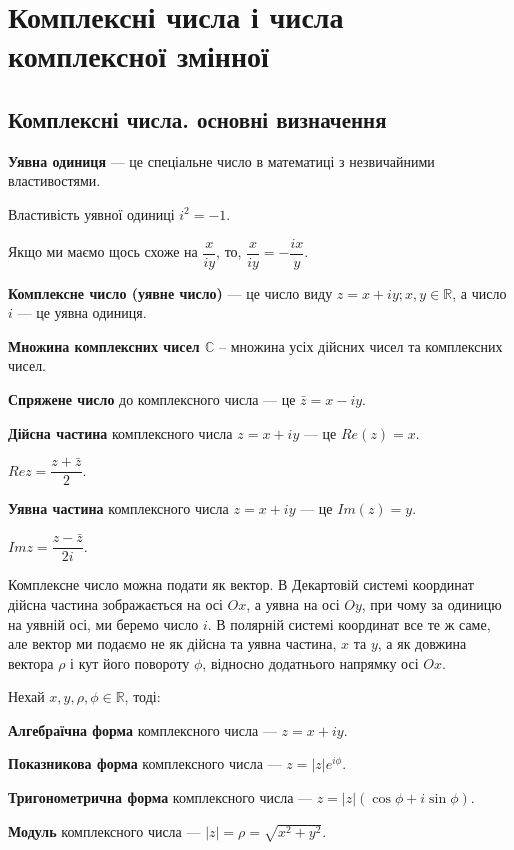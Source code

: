 \chapter{Комплексні числа і числа комплексної змінної}

\section{Комплексні числа. основні визначення}

\textbf{Уявна одиниця} --- це спеціальне число в математиці з незвичайними властивостями.

Властивість уявної одиниці $i^2 = -1$.

Якщо ми маємо щось схоже на $\dfrac{x}{iy}$, то, $\dfrac{x}{iy} = - \dfrac{ix}{y}$.

\textbf{Комплексне число (уявне число)} --- це число виду $z = x + iy; x, y \in \mathbb{R}$,
а число $i$ --- це уявна одиниця.

\textbf{Множина комплексних чисел $\mathbb{C}$} -- множина усіх дійсних чисел та комплексних чисел.

\textbf{Спряжене число} до комплексного числа --- це $\bar z = x - iy$.

\textbf{Дійсна частина} комплексного числа $z = x + iy$ --- це $Re(z) = x$.

$Re z = \dfrac{z + \bar{z}}{2}$.

\textbf{Уявна частина} комплексного числа $z = x + iy$ --- це $Im(z) = y$.

$Im z = \dfrac{z - \bar{z}}{2i}$.

Комплексне число можна подати як вектор.
В Декартовій системі координат дійсна частина зображається на осі $Ox$, а уявна на осі $Oy$, при чому за одиницю на уявній осі, ми беремо число $i$.
В полярній системі координат все те ж саме, але вектор ми подаємо не як дійсна  та уявна частина, $x$ та $y$, а як довжина вектора $\rho$ і кут його повороту $\phi$, відносно додатнього напрямку осі $Ox$.

Нехай $x, y, \rho, \phi \in \mathbb{R}$, тоді:

\textbf{Алгебраїчна форма} комплексного числа --- $z = x + iy$.

\textbf{Показникова форма} комплексного числа --- $z = |z|e^{i \phi}$.

\textbf{Тригонометрична форма} комплексного числа --- $z = |z| (\cos \phi + i \sin \phi)$.

\textbf{Модуль} комплексного числа --- $|z| = \rho = \sqrt{x^2 + y^2}$.

